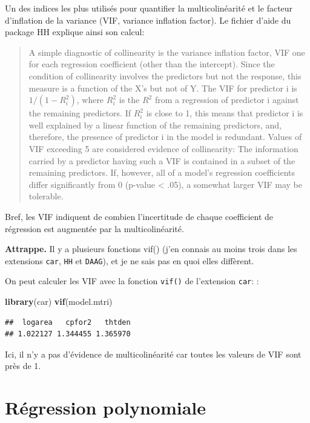 \documentclass[12pt,]{book}
\newenvironment{Shaded}{\begin{snugshade}}{\end{snugshade}}
\newcommand{\KeywordTok}[1]{\textcolor[rgb]{0.13,0.29,0.53}{\textbf{#1}}}
\newcommand{\NormalTok}[1]{#1}
\begin{document}
Un des indices les plus utilisés pour quantifier la multicolinéarité et le facteur d'inflation de la variance (VIF, variance inflation factor). Le fichier d'aide du package HH explique ainsi son calcul:

\begin{quote}
A simple diagnostic of collinearity is the variance inflation factor, VIF one for each regression coefficient (other than the intercept). Since the condition of collinearity involves the predictors but not the response, this measure is a function of the X's but not of Y. The VIF for predictor i is \(1/(1-R_i^2)\), where \(R_i^2\) is the \(R^2\) from a regression of predictor i against the remaining predictors. If \(R_i^2\) is close to 1, this means that predictor i is well explained by a linear function of the remaining predictors, and, therefore, the presence of predictor i in the model is redundant. Values of VIF exceeding 5 are considered evidence of collinearity: The information carried by a predictor having such a VIF is contained in a subset of the remaining predictors. If, however, all of a model's regression coefficients differ significantly from 0 (p-value \textless{} .05), a somewhat larger VIF may be tolerable.
\end{quote}

Bref, les VIF indiquent de combien l'incertitude de chaque coefficient de régression est augmentée par la multicolinéarité.

\textbf{Attrappe.} Il y a plusieurs fonctions vif() (j'en connais au moins trois dans les extensions \texttt{car}, \texttt{HH} et \texttt{DAAG}), et je ne sais pas en quoi elles diffèrent.

On peut calculer les VIF avec la fonction \texttt{vif()} de l'extension \texttt{car}: :

\begin{Shaded}
\begin{Highlighting}[]
\KeywordTok{library}\NormalTok{(car)}
\KeywordTok{vif}\NormalTok{(model.mtri)}
\end{Highlighting}
\end{Shaded}

\begin{verbatim}
##  logarea   cpfor2   thtden 
## 1.022127 1.344455 1.365970
\end{verbatim}

Ici, il n'y a pas d'évidence de multicolinéarité car toutes les valeurs de VIF sont près de 1.

\hypertarget{ruxe9gression-polynomiale}{%
\section{Régression polynomiale}\label{ruxe9gression-polynomiale}}
\end{document}
